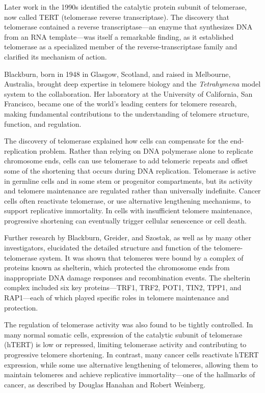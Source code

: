 Later work in the 1990s identified the catalytic protein subunit of telomerase, now called TERT (telomerase reverse transcriptase). The discovery that telomerase contained a reverse transcriptase---an enzyme that synthesizes DNA from an RNA template---was itself a remarkable finding, as it established telomerase as a specialized member of the reverse-transcriptase family and clarified its mechanism of action.

Blackburn, born in 1948 in Glasgow, Scotland, and raised in Melbourne, Australia, brought deep expertise in telomere biology and the \textit{Tetrahymena} model system to the collaboration. Her laboratory at the University of California, San Francisco, became one of the world's leading centers for telomere research, making fundamental contributions to the understanding of telomere structure, function, and regulation.

The discovery of telomerase explained how cells can compensate for the end-replication problem. Rather than relying on DNA polymerase alone to replicate chromosome ends, cells can use telomerase to add telomeric repeats and offset some of the shortening that occurs during DNA replication. Telomerase is active in germline cells and in some stem or progenitor compartments, but its activity and telomere maintenance are regulated rather than universally indefinite. Cancer cells often reactivate telomerase, or use alternative lengthening mechanisms, to support replicative immortality. In cells with insufficient telomere maintenance, progressive shortening can eventually trigger cellular senescence or cell death.

Further research by Blackburn, Greider, and Szostak, as well as by many other investigators, elucidated the detailed structure and function of the telomere-telomerase system. It was shown that telomeres were bound by a complex of proteins known as shelterin, which protected the chromosome ends from inappropriate DNA damage responses and recombination events. The shelterin complex included six key proteins---TRF1, TRF2, POT1, TIN2, TPP1, and RAP1---each of which played specific roles in telomere maintenance and protection.

The regulation of telomerase activity was also found to be tightly controlled. In many normal somatic cells, expression of the catalytic subunit of telomerase (hTERT) is low or repressed, limiting telomerase activity and contributing to progressive telomere shortening. In contrast, many cancer cells reactivate hTERT expression, while some use alternative lengthening of telomeres, allowing them to maintain telomeres and achieve replicative immortality---one of the hallmarks of cancer, as described by Douglas Hanahan and Robert Weinberg.

